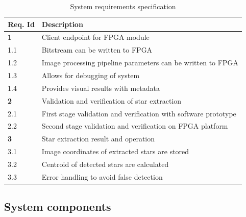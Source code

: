 \documentclass[12pt]{report}
\begin{document}
\begin{table}[h]
    \begin{tabular}{|p{1.75cm}|p{10cm}|}
        \hline
        \textbf{Req. Id}& \textbf{Description}\\
        \hline
        \hline
        \textbf{1}&Client endpoint for FPGA module\\
        \hline
        1.1\label{req1.1}&Bitstream can be written to FPGA\\
        1.2\label{req1.2}&Image processing pipeline parameters can be written to FPGA\\
        1.3\label{req1.3}&Allows for debugging of system\\
        1.4\label{req1.4}&Provides visual results with metadata\\
        \hline
        \hline
        \textbf{2}&Validation and verification of star extraction\\
        \hline
        2.1\label{req2.1}&First stage validation and verification with software prototype\\
        2.2\label{req2.2}&Second stage validation and verification on FPGA platform\\ 
        \hline
        \hline
        \textbf{3}&Star extraction result and operation\\
        \hline
        3.1\label{req3.1}&Image coordinates of extracted stars are stored\\
        3.2\label{req3.2}&Centroid of detected stars are calculated\\
        3.3\label{req3.3}&Error handling to avoid false detection\\
        \hline
    \end{tabular}
    \caption{System requirements specification}
    \label{table:1}
\end{table}

\subsection{System components}
\end{document}
